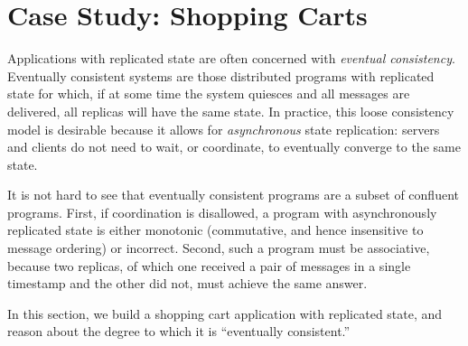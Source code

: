 \section{Case Study: Shopping Carts}
Applications with replicated state are often concerned with {\em eventual
consistency}.  
Eventually consistent systems are those distributed programs with replicated state for which,
if at some time the system quiesces and all 
messages are delivered, all replicas will have the same state.
In practice, this loose consistency model is desirable because it allows for \emph{asynchronous}
state replication: servers and clients do not
need to wait, or coordinate, to eventually converge to the same state.

%

It is not hard to see that eventually consistent programs are a subset of
confluent programs.  First, if coordination is disallowed, 
a program with asynchronously replicated state is either monotonic (commutative, and hence
insensitive to message ordering)
or incorrect.  Second, such a program must be
associative, because two replicas, of which one received a pair of messages in
a single timestamp and the other did not, must achieve the same answer.

In this section, we build a shopping cart application with replicated state,
and reason about the degree to which it is ``eventually consistent.''

%
%
%




